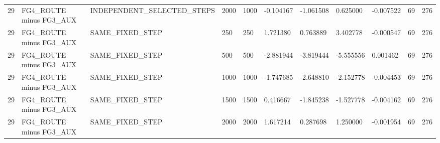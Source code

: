 \begin{tabular}{lllllllllll}
29 & FG4\_ROUTE minus FG3\_AUX & INDEPENDENT\_SELECTED\_STEPS & 2000 & 1000 & -0.104167 & -1.061508 & 0.625000 & -0.007522 & 69 & 276 \\
29 & FG4\_ROUTE minus FG3\_AUX & SAME\_FIXED\_STEP & 250 & 250 & 1.721380 & 0.763889 & 3.402778 & -0.000547 & 69 & 276 \\
29 & FG4\_ROUTE minus FG3\_AUX & SAME\_FIXED\_STEP & 500 & 500 & -2.881944 & -3.819444 & -5.555556 & 0.001462 & 69 & 276 \\
29 & FG4\_ROUTE minus FG3\_AUX & SAME\_FIXED\_STEP & 1000 & 1000 & -1.747685 & -2.648810 & -2.152778 & -0.004453 & 69 & 276 \\
29 & FG4\_ROUTE minus FG3\_AUX & SAME\_FIXED\_STEP & 1500 & 1500 & 0.416667 & -1.845238 & -1.527778 & -0.004162 & 69 & 276 \\
29 & FG4\_ROUTE minus FG3\_AUX & SAME\_FIXED\_STEP & 2000 & 2000 & 1.617214 & 0.287698 & 1.250000 & -0.001954 & 69 & 276 \\
\bottomrule
\end{tabular}
